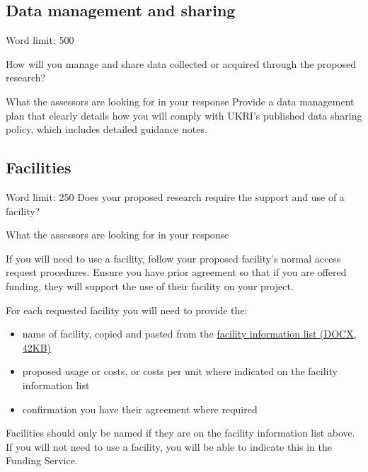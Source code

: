 \documentclass[12pt]{article}
\newenvironment{instruction}{\par\color{red}}{\par}
\begin{document}
% 

\pagebreak
\subsection{Data management and sharing}

\begin{instruction}

Word limit: 500

How will you manage and share data collected or acquired through the
proposed research?

What the assessors are looking for in your response
Provide a data management plan that clearly details how you will comply with
UKRI’s published data sharing policy, which includes detailed guidance notes.

\end{instruction}

% 

\pagebreak
\subsection{Facilities}

\begin{instruction}

Word limit: 250
Does your proposed research require the support and use of a facility?

What the assessors are looking for in your response

If you will need to use a facility, follow your proposed facility’s normal access
request procedures. Ensure you have prior agreement so that if you are offered
funding, they will support the use of their facility on your project.

For each requested facility you will need to provide the:

\begin{itemize}

	\item name of facility, copied and pasted from the \href{https://ukri-tfs-prod-assets.s3.eu-west-2.amazonaws.com/Facility+Information+for+TFS+updated+Sept+24.docx}{facility information list (DOCX, 42KB)}

	\item proposed usage or costs, or costs per unit where indicated on the facility
information list

	\item confirmation you have their agreement where required

\end{itemize}

Facilities should only be named if they are on the facility information list above.
If you will not need to use a facility, you will be able to indicate this in the
Funding Service.

\end{instruction}
\end{document}
